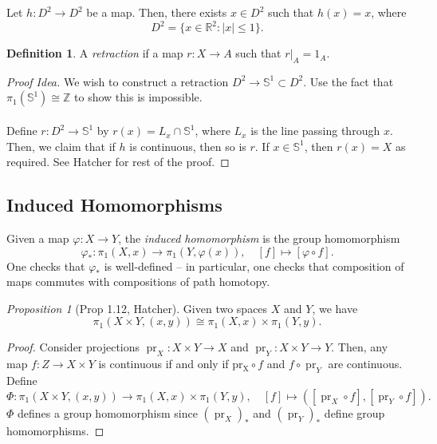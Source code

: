 \documentclass[a4paper]{report}
\theoremstyle{definition}
\newtheorem{definition}{Definition}
\theoremstyle{remark}
\theoremstyle{proposition}
\newtheorem{proposition}{Proposition}
\theoremstyle{conjecture}
\theoremstyle{lemma}
\theoremstyle{corollary}
\theoremstyle{exercise}
\newcommand{\on}{\operatorname}
\begin{document}
\begin{theorem}
    Let $h : D^2 \to D^2$ be a map. Then, there exists $x \in D^2$ such that
    $h(x) = x$, where
    $$D^2 = \lbrace x \in \mathbb{R}^2 : \vert x \vert \leq 1\rbrace.$$
\end{theorem}

\begin{definition}
    A \emph{retraction} if a map $r : X \to A$ 
    such that $r\vert_A = 1_A$.
\end{definition}

\begin{proof}[Proof Idea]
    We wish to construct a retraction $D^2 \to \mathbb{S}^1 \subset D^2$.
    Use the fact that $\pi_1(\mathbb{S}^1)\cong \mathbb{Z}$ to show this
    is impossible.\\\\
    Define $r : D^2 \to \mathbb{S}^1$ by $r(x) = L_x \cap \mathbb{S}^1$,
    where $L_x$ is the line passing through $x$.
    Then, we claim that if $h$ is continuous, then so is $r$.
    If $x \in \mathbb{S}^1$, then $r(x) = X$ as required. 
    See Hatcher for rest of the proof.
\end{proof}

\subsection{Induced Homomorphisms}

Given a map $\varphi: X \to Y$, the \emph{induced homomorphism} is the group 
homomorphism $$\varphi_\ast : \pi_1(X,x) \longrightarrow \pi_1(Y,\varphi(x)), \quad [f] \longmapsto [\varphi \circ f].$$
One checks that $\varphi_\ast$ is well-defined -- in particular, one checks 
that composition of maps commutes with compositions of path homotopy.

\begin{proposition}[Prop 1.12, Hatcher]
    Given two spaces $X$ and $Y$, we have
    $$\pi_1(X\times Y, (x,y)) \cong \pi_1(X,x) \times \pi_1(Y,y).$$
\end{proposition}

\begin{proof}
    Consider projections 
    $\on{pr}_X : X \times Y \to X$ and $\on{pr}_Y : X \times Y \to Y$.
    Then, any map $f : Z \to X\times Y$ is continuous if and only if 
    $\on{pr_X} \circ f$ and $f \circ \on{pr}_Y$ are continuous.
    Define $$\Phi : \pi_1(X\times Y,(x,y)) \longrightarrow \pi_1(X,x) \times \pi_1(Y,y),\quad [f] \longmapsto ([\on{pr}_X\circ f], [\on{pr}_Y\circ f]).$$
    $\Phi$ defines a group homomorphism since $(\on{pr}_X)_\ast$ and 
    $(\on{pr}_Y)_\ast$ define group homomorphisms.
\end{proof}
\end{document}
